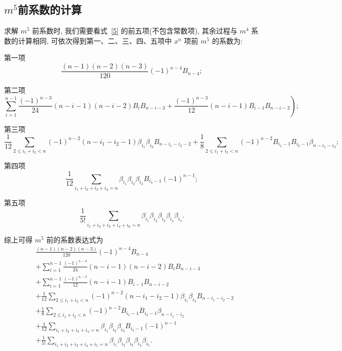 \documentclass{CombPaper}
\begin{document}
\subsection{$m^{5}$前系数的计算}
求解 $m^{5}$ 前系数时, 我们需要看式~\eqref{5} 的前五项(不包含常数项), 其余过程与 $m^{4}$ 系数的计算相同, 可依次得到第一、二、三、四、五项中 $x^{n}$ 项前 $m^{5}$ 的系数为:\par
第一项
\begin{equation}
\frac{(n-1)(n-2)(n-3)}{120}(-1)^{n-4} B_{n-4};
\end{equation}\par
第二项
\begin{equation}
\left.\sum_{i=1}^{n-1} \frac{(-1)^{n-3}}{24}(n-i-1)(n-i-2) B_{i} B_{n-i-3}+\frac{(-1)^{n-3}}{12}(n-i-1) B_{i-1} B_{n-i-2}\right);
\end{equation}\par
第三项
\begin{equation}
\frac{1}{12} \sum_{2 \leq i_{1}+i_{2}<n}(-1)^{n-2}\left(n-i_{1}-i_{2}-1\right) \beta_{i_{1}} \beta_{i_{2}} B_{n-i_{1}-i_{2}-2}+\frac{1}{8} \sum_{2 \leq i_{1}+i_{2}<n}(-1)^{n-2} B_{i_{1}-1} B_{i_{2}-1} \beta_{n-i_{1}-i_{2}};
\end{equation}\par
第四项
\begin{equation}
\frac{1}{12} \sum_{i_{1}+i_{2}+i_{3}+i_{4}=n} \beta_{i_{1}} \beta_{i_{2}} \beta_{i_{3}} B_{i_{4}-1}(-1)^{n-1};
\end{equation}\par
第五项
\begin{equation}
\frac{1}{5 !} \sum_{i_{1}+i_{2}+i_{3}+i_{4}+i_{6}=n} \beta_{i_{1}} \beta_{i_{2}} \beta_{i_{3}} \beta_{i_{4}} \beta_{i_{5}}.
\end{equation}\par
综上可得 $m^{5}$ 前的系数表达式为
\begin{equation}
\begin{aligned}
&\frac{(n-1)(n-2)(n-3)}{120}(-1)^{n-4} B_{n-4} \\
&+\sum_{i=1}^{n-1} \frac{(-1)^{n-3}}{24}(n-i-1)(n-i-2) B_{i} B_{n-i-3} \\
&+\sum_{i=1}^{n-1} \frac{(-1)^{n-3}}{12}(n-i-1) B_{i-1} B_{n-i-2} \\
&+\frac{1}{12} \sum_{2 \leq i_{1}+i_{2}<n}(-1)^{n-2}\left(n-i_{1}-i_{2}-1\right) \beta_{i_{1}} \beta_{i_{2}} B_{n-i_{1}-i_{2}-2} \\
&+\frac{1}{8} \sum_{2 \leq i_{1}+i_{2}<n}(-1)^{n-2} B_{i_{1}-1} B_{i_{2}-1} \beta_{n-i_{1}-i_{2}} \\
&+\frac{1}{12} \sum_{i_{1}+i_{2}+i_{3}+i_{4}=n} \beta_{i_{1}} \beta_{i_{2}} \beta_{i_{3}} B_{i_{4}-1}(-1)^{n-1} \\
&+\frac{1}{5 !} \sum_{i_{1}+i_{2}+i_{3}+i_{4}+i_{5}=n} \beta_{i_{1}} \beta_{i_{2}} \beta_{i_{3}} \beta_{i_{4}} \beta_{i_{5}}.
\end{aligned}
\end{equation}
\end{document}
